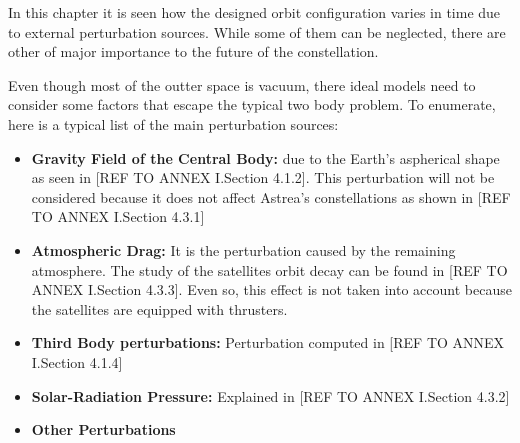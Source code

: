 \label{TypesPerturb}

In this chapter it is seen how the designed orbit configuration varies in time due to external perturbation sources. While some of them can be neglected, there are other of major importance to the future of the constellation.

Even though most of the outter space is vacuum, there ideal models need to consider some factors that escape the typical two body problem. To enumerate, here is a typical list of the main perturbation sources:

\begin{itemize}
\item \textbf{Gravity Field of the Central Body:} due to the Earth's aspherical shape as seen in [REF TO ANNEX I.Section 4.1.2]. This perturbation will not be considered because it does not affect Astrea's constellations as shown in [REF TO ANNEX I.Section 4.3.1]
\item \textbf{Atmospheric Drag:} It is the perturbation caused by the remaining atmosphere. The study of the satellites orbit decay can be found in [REF TO ANNEX I.Section 4.3.3]. Even so, this effect is not taken into account because the satellites are equipped with thrusters.
\item \textbf{Third Body perturbations:} Perturbation computed in [REF TO ANNEX I.Section 4.1.4]
\item \textbf{Solar-Radiation Pressure:} Explained in [REF TO ANNEX I.Section 4.3.2]
\item \textbf{Other Perturbations}
\end{itemize}